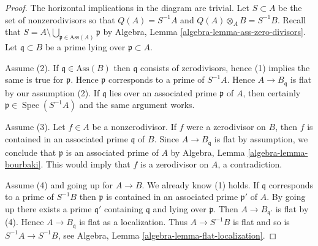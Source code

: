 \documentclass{stacks-project}
\theoremstyle{plain}
\theoremstyle{definition}
\theoremstyle{remark}
\numberwithin{equation}{subsection}
\def\Spec{\mathop{\mathrm{Spec}}}
\begin{document}
\begin{proof}
The horizontal implications in the diagram are trivial.
Let $S \subset A$ be the set of nonzerodivisors so that
$Q(A) = S^{-1}A$ and $Q(A) \otimes_A B = S^{-1}B$. Recall that
$S = A \setminus \bigcup_{\mathfrak p \in \text{Ass}(A)} \mathfrak p$
by Algebra, Lemma \ref{algebra-lemma-ass-zero-divisors}.
Let $\mathfrak q \subset B$ be a prime lying over $\mathfrak p \subset A$.

\medskip\noindent
Assume (2). If $\mathfrak q \in \text{Ass}(B)$ then
$\mathfrak q$ consists of zerodivisors, hence (1) implies
the same is true for $\mathfrak p$. Hence
$\mathfrak p$ corresponds to a prime of $S^{-1}A$.
Hence $A \to B_\mathfrak q$ is flat by our assumption (2).
If $\mathfrak q$ lies over an associated prime $\mathfrak p$
of $A$, then certainly $\mathfrak p \in \Spec(S^{-1}A)$ and the
same argument works.

\medskip\noindent
Assume (3). Let $f \in A$ be a nonzerodivisor. If $f$ were a zerodivisor
on $B$, then $f$ is contained in an associated prime $\mathfrak q$
of $B$. Since $A \to B_\mathfrak q$ is flat by assumption, we conclude that
$\mathfrak p$ is an associated prime of $A$ by
Algebra, Lemma \ref{algebra-lemma-bourbaki}. This would imply that
$f$ is a zerodivisor on $A$, a contradiction.

\medskip\noindent
Assume (4) and going up for $A \to B$. We already know (1) holds.
If $\mathfrak q$ corresponds to a prime of $S^{-1}B$ then $\mathfrak p$
is contained in an associated prime $\mathfrak p'$ of $A$. By going up
there exists a prime $\mathfrak q'$ containing $\mathfrak q$ and lying
over $\mathfrak p$. Then $A \to B_{\mathfrak q'}$ is flat by
(4). Hence $A \to B_{\mathfrak q}$ is flat as a localization.
Thus $A \to S^{-1}B$ is flat and so is $S^{-1}A \to S^{-1}B$, see
Algebra, Lemma \ref{algebra-lemma-flat-localization}.
\end{proof}
\end{document}
